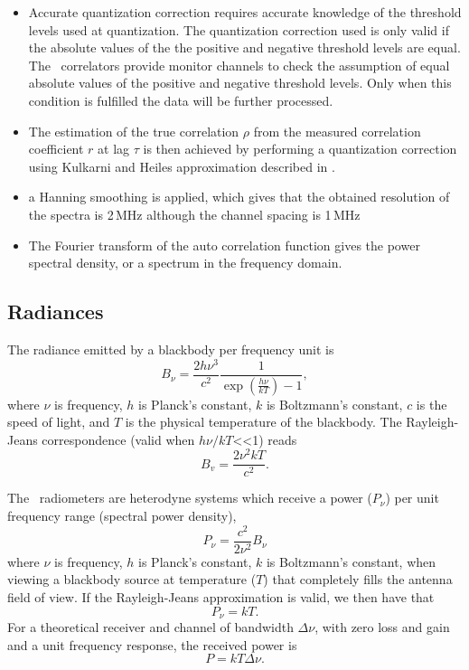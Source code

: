 \begin{itemize}

\item Accurate quantization correction requires accurate knowledge of the threshold
 levels used at quantization. The quantization correction used is only valid 
if the absolute values of the the positive and negative threshold levels are equal. 
The \smr\ correlators provide monitor channels to check the
assumption of equal absolute values of the positive and negative threshold levels.
Only when this condition is fulfilled the data will be further processed.

\item The estimation of the true correlation \(\rho\) from the measured correlation
coefficient \(r\) at lag \(\tau\) is then achieved by performing a quantization correction using
Kulkarni and Heiles approximation described in \citet{ohlberg:theod:03}.

\item a Hanning smoothing is applied, which gives that the obtained resolution 
of the spectra is 2\,MHz although the channel spacing is 1\,MHz

\item The Fourier transform of the auto correlation function gives the
power spectral density, or a spectrum in the frequency domain.


\end{itemize}


\subsection{Radiances}


The radiance emitted by a blackbody per frequency unit is
\begin{equation}
 B_{\nu} = \frac{2h\nu^{3}}{c^{2}}\frac{1}{\exp(\frac{h\nu}{kT})-1},
\end{equation}   
where \(\nu\) is frequency, \(h\) is Planck's constant, \(k\) is Boltzmann's constant,
\(c\) is the speed of light, and \(T\) is the physical temperature of the
blackbody.
The Rayleigh-Jeans correspondence (valid when \(h\nu/kT\)<<1) reads
\begin{equation}
 B_{v}=\frac{2\nu^{2}kT}{c^{2}}.
\end{equation}

The \smr\ radiometers are heterodyne systems which receive a power (\(P_{\nu}\))
per unit frequency range (spectral power density),
\begin{equation}
P_{\nu} = \frac{c^{2}}{2\nu^{2}}B_{\nu}
\end{equation} 
where \(\nu\) is frequency, \(h\) is Planck's constant, \(k\) is Boltzmann's constant,
when viewing a blackbody source at temperature (\(T\)) that completely
fills the antenna field of view. 
If the Rayleigh-Jeans approximation is valid, we then have that
\begin{equation}
P_{\nu} = kT.
\end{equation}
For a theoretical receiver and channel of bandwidth \(\Delta \nu\), with zero loss and gain 
and a unit frequency response, the received power is
\begin{equation}
 P = kT\Delta \nu.
\end{equation}   

